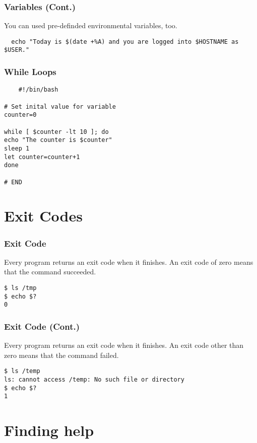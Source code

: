 \documentclass[12pt,handout,aspectratio=169]{beamer}
\begin{document}
\begin{frame}[fragile]
  \frametitle{Variables (Cont.)}
You can used pre-definded environmental variables, too.
\begin{verbatim}
  echo "Today is $(date +%A) and you are logged into $HOSTNAME as $USER."
\end{verbatim}

\end{frame}
\begin{frame}[fragile]
  \frametitle{While Loops}
  \begin{verbatim}
    #!/bin/bash

# Set inital value for variable
counter=0

while [ $counter -lt 10 ]; do
echo "The counter is $counter"
sleep 1
let counter=counter+1
done

# END
  \end{verbatim}
\end{frame}
\section{Exit Codes}

\begin{frame}[fragile]
  \frametitle{Exit Code}
  Every program returns an exit code when it finishes. An exit code of zero means that the command succeeded.
\begin{verbatim}
$ ls /tmp
$ echo $?
0
\end{verbatim}
\end{frame}
\begin{frame}[fragile]
  \frametitle{Exit Code (Cont.)}
  Every program returns an exit code when it finishes. An exit code other than zero means that the command failed.
\begin{verbatim}
$ ls /temp
ls: cannot access /temp: No such file or directory
$ echo $?
1
\end{verbatim}

\end{frame}
\section{Finding help}
\end{document}
